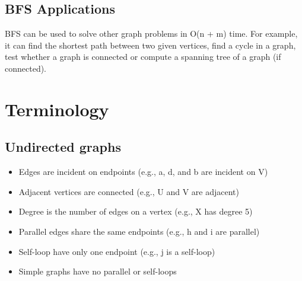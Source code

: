 \documentclass[12pt]{article}
\newcommand{\1}{\space \quad}
\newcommand{\2}{\quad \quad \quad}
\newcommand{\3}{\quad \quad \quad \quad \space}
\newcommand{\4}{\quad \quad \quad \quad \quad \quad}
\newcommand{\5}{\quad \quad \quad \quad \quad \quad \quad \space}
\begin{document}
\subsection{BFS Applications}
BFS can be used to solve other graph problems in O(n + m) time. For example, it can
find the shortest path between two given vertices, find a cycle in a graph,
test whether a graph is connected or compute a spanning tree of a graph (if connected).

\section{Terminology}

\subsection{Undirected graphs}
\begin{minipage}[l]{0.6\textwidth}
  \begin{itemize}
    \item Edges are incident on endpoints (e.g., a, d, and b are incident on V)
    \item Adjacent vertices are connected (e.g., U and V are adjacent)
    \item Degree is the number of edges on a vertex (e.g., X has degree 5)
    \item Parallel edges share the same endpoints (e.g., h and i are parallel)
    \item Self-loop have only one endpoint (e.g., j is a self-loop)
    \item Simple graphs have no parallel or self-loops
  \end{itemize}
\end{minipage}
\end{document}
